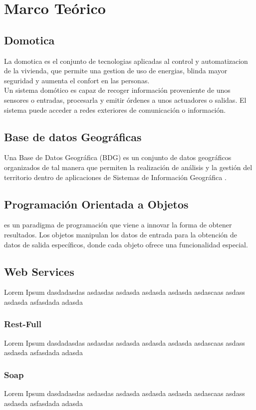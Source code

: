 \section{Marco Teórico}

\subsection{Domotica}
La domotica es el conjunto de tecnologias aplicadas al control y automatizacion  de la vivienda, que permite una gestion de uso de energias, blinda mayor seguridad y aumenta el confort en las personas.\\
Un sistema domótico es capaz de recoger información proveniente de unos sensores o entradas, procesarla y emitir órdenes a unos actuadores o salidas. El sistema puede acceder a redes exteriores de comunicación o información.\\
\subsection{Base de datos Geográficas}
Una Base de Datos Geográfica (BDG) es un conjunto de datos geográficos organizados de tal manera que permiten la realización de análisis y la gestión del territorio dentro de aplicaciones de Sistemas de Información Geográfica .\\
\subsection{Programación Orientada a Objetos}
 es un paradigma de programación que viene a innovar la forma de obtener resultados. Los objetos manipulan los datos de entrada para la obtención de datos de salida específicos, donde cada objeto ofrece una funcionalidad especial.\\
\subsection{Web Services}
Lorem Ipsum dasdadasdas asdasdas asdasda asdasda asdasda asdascaas asdass asdasda asfasdada adasda
\subsubsection{Rest-Full}
Lorem Ipsum dasdadasdas asdasdas asdasda asdasda asdasda asdascaas asdass asdasda asfasdada adasda
\subsubsection{Soap}
Lorem Ipsum dasdadasdas asdasdas asdasda asdasda asdasda asdascaas asdass asdasda asfasdada adasda
